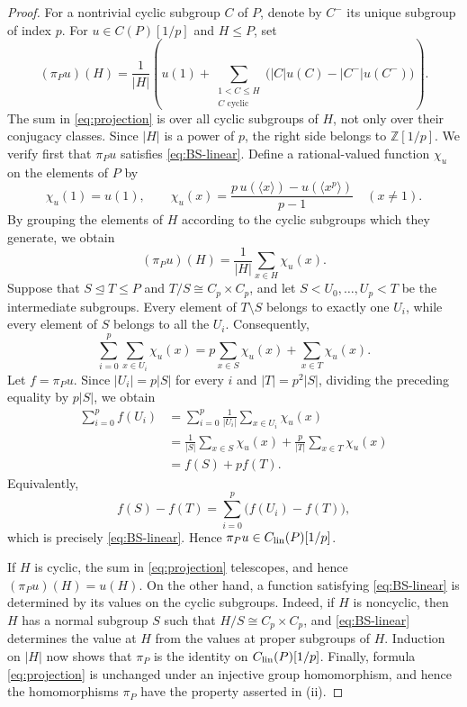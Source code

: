 \documentclass[preprint,12pt,3p]{elsarticle}
\def\Z{\mathbb{Z}}
\begin{document}
\begin{proof}
For a nontrivial cyclic subgroup $C$ of $P$, denote by $C^-$ its unique subgroup of index $p$.  For $u\in C(P)[1/p]$ and $H\leq P$, set
\begin{equation}\label{eq:projection}
 (\pi_Pu)(H)=\frac{1}{|H|}\left(
 u(1)+\sum_{\substack{1<C\leq H\\ C\text{ cyclic}}}
 \big(|C|u(C)-|C^-|u(C^-)\big)\right).
\end{equation}
The sum in \eqref{eq:projection} is over all cyclic subgroups of $H$, not only over their conjugacy classes.  Since $|H|$ is a power of $p$, the right side belongs to $\Z[1/p]$. We verify first that $\pi_Pu$ satisfies \eqref{eq:BS-linear}.  Define a rational-valued function $\chi_u$ on the elements of $P$ by
$$
 \chi_u(1)=u(1),\qquad
 \chi_u(x)=\frac{p\,u(\langle x\rangle)
 -u(\langle x^p\rangle)}{p-1}\quad (x\neq 1).
$$
By grouping the elements of $H$ according to the cyclic subgroups which they generate, we obtain
$$
 (\pi_Pu)(H)=\frac{1}{|H|}\sum_{x\in H}\chi_u(x).
$$
Suppose that $S\trianglelefteq T\leq P$ and $T/S\cong C_p\times C_p$, and let $S<U_0,\ldots,U_p<T$ be the intermediate subgroups.  Every element of $T\setminus S$ belongs to exactly one $U_i$, while every element of $S$ belongs to all the $U_i$.  Consequently,
$$
 \sum_{i=0}^{p}\sum_{x\in U_i}\chi_u(x)
 =p\sum_{x\in S}\chi_u(x)+\sum_{x\in T}\chi_u(x).
$$
Let $f=\pi_Pu$. Since $|U_i|=p|S|$ for every $i$ and $|T|=p^2|S|$, dividing the preceding equality by $p|S|$, we obtain
$$
 \begin{aligned}
 \sum_{i=0}^{p}f(U_i)
 &=\sum_{i=0}^{p}\frac{1}{|U_i|}\sum_{x\in U_i}\chi_u(x)\\
 &=\frac{1}{|S|}\sum_{x\in S}\chi_u(x)+\frac{p}{|T|}\sum_{x\in T}\chi_u(x)\\
 &=f(S)+pf(T).
 \end{aligned}
$$
Equivalently,
$$
 f(S)-f(T)=\sum_{i=0}^{p}\bigl(f(U_i)-f(T)\bigr),
$$
which is precisely \eqref{eq:BS-linear}. Hence $\pi_Pu\in C_{\rm lin}(P)[1/p]$.

If $H$ is cyclic, the sum in \eqref{eq:projection} telescopes, and hence $(\pi_Pu)(H)=u(H)$.  On the other hand, a function satisfying \eqref{eq:BS-linear} is determined by its values on the cyclic subgroups. Indeed, if $H$ is noncyclic, then $H$ has a normal subgroup $S$ such that $H/S\cong C_p\times C_p$, and \eqref{eq:BS-linear} determines the value at $H$ from the values at proper subgroups of $H$.  Induction on $|H|$ now shows that $\pi_P$ is the identity on $C_{\rm lin}(P)[1/p]$. Finally, formula \eqref{eq:projection} is unchanged under an injective group homomorphism, and hence the homomorphisms $\pi_P$ have the property asserted in (ii).
\end{proof}
\end{document}
